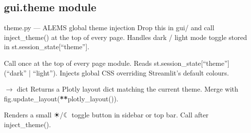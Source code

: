 \documentclass[letterpaper,10pt,english]{sphinxmanual}
\begin{document}
\sphinxstepscope


\subsection{gui.theme module}
\label{\detokenize{gui.theme:module-gui.theme}}\label{\detokenize{gui.theme:gui-theme-module}}\label{\detokenize{gui.theme::doc}}
\sphinxAtStartPar
theme.py  —  A\sphinxhyphen{}LEMS global theme injection
Drop this in gui/ and call inject\_theme() at the top of every page.
Handles dark / light mode toggle stored in st.session\_state{[}“theme”{]}.

\begin{fulllineitems}
\label{\detokenize{gui.theme:gui.theme.inject_theme}}
\pysigstartsignatures
\pysiglinewithargsret
{}
{}
{}
\pysigstopsignatures
\sphinxAtStartPar
Call once at the top of every page module.
Reads st.session\_state{[}“theme”{]} (“dark” | “light”).
Injects global CSS overriding Streamlit’s default colours.

\end{fulllineitems}


\begin{fulllineitems}
\label{\detokenize{gui.theme:gui.theme.plotly_layout}}
\pysigstartsignatures
\pysiglinewithargsret
{}
{}
{{ $\rightarrow$ dict}}
\pysigstopsignatures
\sphinxAtStartPar
Returns a Plotly layout dict matching the current theme.
Merge with fig.update\_layout({\color{red}\bfseries{}**}plotly\_layout()).

\end{fulllineitems}


\begin{fulllineitems}
\label{\detokenize{gui.theme:gui.theme.theme_toggle_button}}
\pysigstartsignatures
\pysiglinewithargsret
{}
{}
{}
\pysigstopsignatures
\sphinxAtStartPar
Renders a small ☀/☾ toggle button in sidebar or top bar.
Call after inject\_theme().

\end{fulllineitems}
\end{document}
